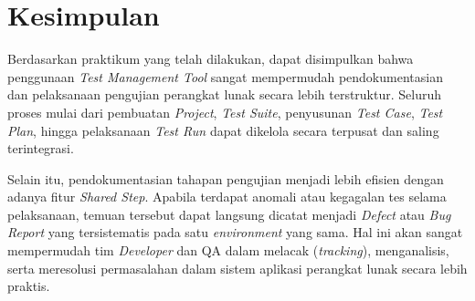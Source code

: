 \documentclass[a4paper,oneside,12pt]{report}
\renewcommand{\bibname}{Daftar Pustaka}
\begin{document}
\clearpage

\chapter{Kesimpulan}

Berdasarkan praktikum yang telah dilakukan, dapat disimpulkan bahwa penggunaan \textit{Test Management Tool} sangat mempermudah pendokumentasian dan pelaksanaan pengujian perangkat lunak secara lebih terstruktur. Seluruh proses mulai dari pembuatan \textit{Project}, \textit{Test Suite}, penyusunan \textit{Test Case}, \textit{Test Plan}, hingga pelaksanaan \textit{Test Run} dapat dikelola secara terpusat dan saling terintegrasi. 

Selain itu, pendokumentasian tahapan pengujian menjadi lebih efisien dengan adanya fitur \textit{Shared Step}. Apabila terdapat anomali atau kegagalan tes selama pelaksanaan, temuan tersebut dapat langsung dicatat menjadi \textit{Defect} atau \textit{Bug Report} yang tersistematis pada satu \textit{environment} yang sama. Hal ini akan sangat mempermudah tim \textit{Developer} dan QA dalam melacak (\textit{tracking}), menganalisis, serta meresolusi permasalahan dalam sistem aplikasi perangkat lunak secara lebih praktis.


\end{document}

